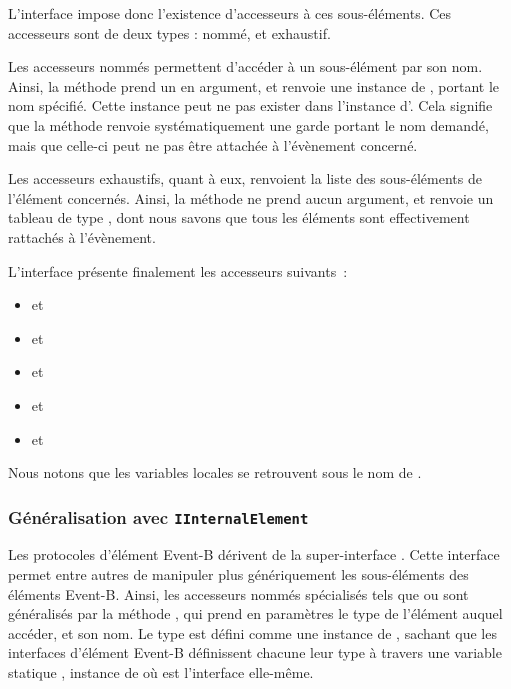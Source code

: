 L'interface  impose donc l'existence d'accesseurs à ces sous-éléments.
Ces accesseurs sont de deux types : nommé, et exhaustif.

Les accesseurs nommés permettent d'accéder à un sous-élément par son nom.
Ainsi, la méthode  prend un  en argument, et renvoie une instance de , portant le nom spécifié.
Cette instance peut ne pas exister dans l'instance d'.
Cela signifie que la méthode  renvoie systématiquement une garde portant le nom demandé, mais que celle-ci %
peut ne pas être attachée à l'évènement concerné.

Les accesseurs exhaustifs, quant à eux, renvoient la liste des sous-éléments de l'élément concernés.
Ainsi, la méthode  ne prend aucun argument, et renvoie un tableau de type , dont nous savons que tous %
les éléments sont effectivement rattachés à l'évènement.

L'interface  présente finalement les accesseurs suivants~:

\begin{itemize}
    \item {} et 
    \item {} et 
    \item {} et 
    \item {} et 
    \item {} et 
\end{itemize}

Nous notons que les variables locales se retrouvent sous le nom de .

\subsubsection{Généralisation avec \texttt{IInternalElement}}

Les protocoles d'élément Event-B dérivent de la super-interface .
Cette interface permet entre autres de manipuler plus génériquement les sous-éléments des éléments Event-B.
Ainsi, les accesseurs nommés spécialisés tels que  ou  sont généralisés par %
la méthode , qui prend en paramètres le type de l'élément auquel accéder, et son nom.
Le type est défini comme une instance de , %
sachant que les interfaces d'élément Event-B définissent chacune leur type à travers une variable statique , instance de %
 où  est l'interface elle-même.


